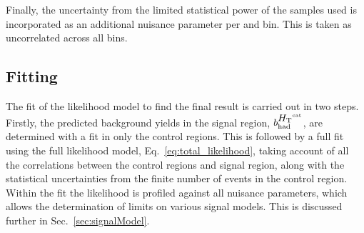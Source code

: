 Finally, the uncertainty from the limited statistical power of the \MC
samples used is incorporated as an additional nuisance parameter per
\htcat and \MHT bin. This is taken as uncorrelated across all bins.

\subsection{Fitting}

The fit of the likelihood model to find the final result is carried
out in two steps. Firstly, the predicted background yields in the
signal region, $b^{\mbox{$H_\text{T}$}^{\text{cat}}}_{\mathrm{had}}$, are determined with a fit
in only the control regions. This is
followed by a full fit using the full likelihood model,
Eq.~\ref{eq:total_likelihood}, taking account of all the correlations
between the control regions and signal region, along with the
statistical uncertainties from the
finite number of events in the control region. Within the fit the
likelihood is profiled against all nuisance parameters, which allows
the determination of limits on various signal models. This is
discussed further in Sec.~\ref{sec:signalModel}.


